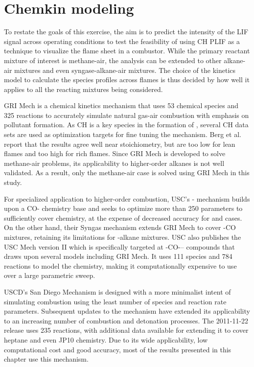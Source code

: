 \section{Chemkin modeling}

To restate the goals of this exercise, the aim is to predict the intensity of the LIF signal across operating conditions to test the feasibility of using CH PLIF as a technique to visualize the flame sheet in a combustor.
While the primary reactant mixture of interest is methane-air, the analysis can be extended to other alkane-air mixtures and even syngase-alkane-air mixtures.
The choice of the kinetics model to calculate the species profiles across flames is thus decided by how well it applies to all the reacting mixtures being considered.

GRI Mech is a chemical kinetics mechanism that uses 53 chemical species and 325 reactions to accurately simulate natural gas-air combustion with emphasis on pollutant formation.
As CH is a key species in the formation of , several CH data sets are used as optimization targets for fine tuning the mechanism.
Berg et al.\cite{2000-berg} report that the results agree well near stoichiometry, but are too low for lean flames and too high for rich flames.
Since GRI Mech is developed to solve methane-air problems, its applicability to higher-order alkanes is not well validated.
As a result, only the methane-air case is solved using GRI Mech in this study.

For specialized application to higher-order combustion, USC's - mechanism builds upon a CO- chemistry base and seeks to optimize more than 250 parameters to sufficiently cover  chemistry, at the expense of decreased accuracy for  and  cases.
On the other hand, their Syngas mechanism extends GRI Mech to cover -CO mixtures, retaining its limitations for -alkane mixtures.
USC also publishes the USC Mech version II which is specifically targeted at -CO--- compounds that draws upon several models including GRI Mech.
It uses 111 species and 784 reactions to model the chemistry, making it computationally expensive to use over a large parametric sweep.

USCD's San Diego Mechanism is designed with a more minimalist intent of simulating combustion using the least number of species and reaction rate parameters.
Subsequent updates to the mechanism have extended its applicability to an increasing number of combustion and detonation processes.
The 2011-11-22 release uses 235 reactions, with additional data available for extending it to cover heptane and even JP10 chemistry.
Due to its wide applicability, low computational cost and good accuracy, most of the results presented in this chapter use this mechanism.


